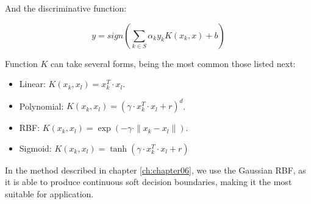 And the discriminative function:

\begin{equation}\label{eq:appendixSVM_soft_discriminative_function}
 y = sign \left( \sum_{k \in S} \alpha_k y_k K(x_k, x) + b \right)
\end{equation}

Function $K$ can take several forms, being the most common those listed next:
\begin{itemize}
 \item Linear: $K(x_k, x_l) = x_k^T \cdot x_l$.
 \item Polynomial: $K(x_k, x_l) = (\gamma \cdot x_k^T \cdot x_l + r)^d$.
 \item \acf{RBF}: $K(x_k, x_l) = \exp(-\gamma \cdot \| x_k - x_l\|)$.
 \item Sigmoid: $K(x_k, x_l) = \tanh(\gamma \cdot x_k^T \cdot x_l + r)$
\end{itemize}

In the method described in chapter \ref{ch:chapter06}, we use the Gaussian \acf{RBF}, as it is able to produce continuous soft decision boundaries, making it the most suitable for application.